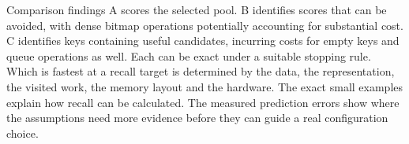 

\begin{resultbox}{Comparison findings}
A scores the selected pool. B identifies scores that can be avoided, with dense bitmap
operations potentially accounting for substantial cost. C identifies keys containing useful
candidates, incurring costs for empty keys and queue operations as well. Each can be exact under a suitable stopping
rule. Which is fastest at a recall target is determined by the data, the representation,
the visited work, the memory layout and the hardware. The exact small examples explain how
recall can be calculated. The measured prediction errors show where the assumptions need more
evidence before they can guide a real configuration choice.
\end{resultbox}

